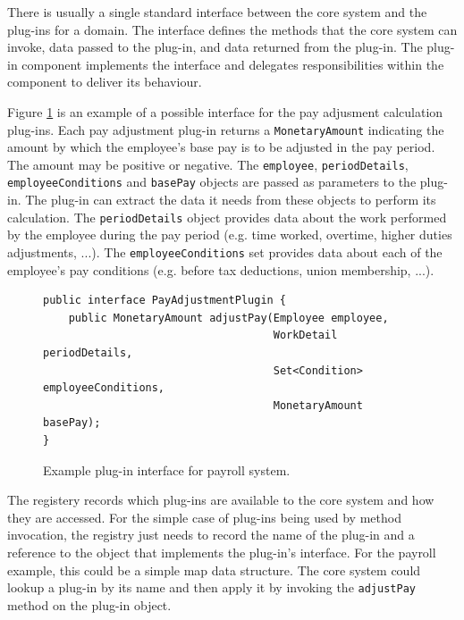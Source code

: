 There is usually a single standard interface between the core system and the plug-ins for a domain.
The interface defines the methods that the core system can invoke, data passed to the plug-in, and data returned from the plug-in.
The plug-in component implements the interface and delegates responsibilities within the component to deliver its behaviour.

Figure \ref{fig:interface} is an example of a possible interface for the pay adjusment calculation plug-ins.
Each pay adjustment plug-in returns a \texttt{MonetaryAmount} indicating the amount by which the employee's base pay is to be adjusted in the pay period.
The amount may be positive or negative.
The \texttt{employee}, \texttt{periodDetails}, \texttt{employeeConditions} and \texttt{basePay} objects are passed as parameters to the plug-in.
The plug-in can extract the data it needs from these objects to perform its calculation.
The \texttt{periodDetails} object provides data about the work performed by the employee during the pay period (e.g. time worked, overtime, higher duties adjustments, ...).
The \texttt{employeeConditions} set provides data about each of the employee's pay conditions (e.g. before tax deductions, union membership, ...).

\begin{figure}[h]%
\centering
\begin{shaded}
\begin{lstlisting}[style=java]
public interface PayAdjustmentPlugin {
    public MonetaryAmount adjustPay(Employee employee,
                                    WorkDetail periodDetails,
                                    Set<Condition> employeeConditions,
                                    MonetaryAmount basePay);
}
\end{lstlisting}
\end{shaded}
\caption{Example plug-in interface for payroll system.}
\label{fig:interface}
\end{figure}

The registery records which plug-ins are available to the core system and how they are accessed.
For the simple case of plug-ins being used by method invocation,
the registry just needs to record the name of the plug-in and a reference to the object that implements the plug-in's interface.
For the payroll example, this could be a simple map data structure.
The core system could lookup a plug-in by its name and then apply it by invoking the \texttt{adjustPay} method on the plug-in object.

